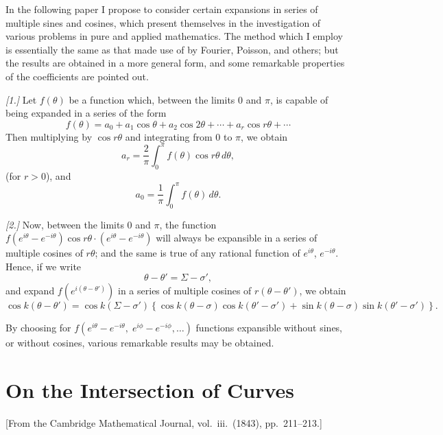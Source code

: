 \documentclass[11pt,a4paper]{book}
\begin{document}
In the following paper I propose to consider certain expansions in series of multiple sines and cosines, which present themselves in the investigation of various problems in pure and applied mathematics. The method which I employ is essentially the same as that made use of by Fourier, Poisson, and others; but the results are obtained in a more general form, and some remarkable properties of the coefficients are pointed out.

\textit{[1.]} Let $f(\theta)$ be a function which, between the limits $0$ and $\pi$, is capable of being expanded in a series of the form
\[
f(\theta) = a_0 + a_1 \cos \theta + a_2 \cos 2\theta + \cdots + a_r \cos r\theta + \cdots
\]
Then multiplying by $\cos r\theta$ and integrating from $0$ to $\pi$, we obtain
\[
a_r = \frac{2}{\pi} \int_0^{\pi} f(\theta) \cos r\theta\, d\theta,
\]
(for $r > 0$), and
\[
a_0 = \frac{1}{\pi} \int_0^{\pi} f(\theta)\, d\theta.
\]

\textit{[2.]} Now, between the limits $0$ and $\pi$, the function $f(e^{i\theta} - e^{-i\theta}) \cos r\theta \cdot (e^{i\theta} - e^{-i\theta})$ will always be expansible in a series of multiple cosines of $r\theta$; and the same is true of any rational function of $e^{i\theta}$, $e^{-i\theta}$. Hence, if we write
\[
\theta - \theta' = \Sigma - \sigma',
\]
and expand $f(e^{i(\theta-\theta')})$ in a series of multiple cosines of $r(\theta - \theta')$, we obtain
\[
\cos k(\theta - \theta') = \cos k(\Sigma - \sigma') \left\{\cos k(\theta - \sigma) \cos k(\theta' - \sigma') + \sin k(\theta - \sigma) \sin k(\theta' - \sigma')\right\}.
\]

By choosing for $f(e^{i\theta} - e^{-i\theta},\; e^{i\phi} - e^{-i\phi},\ldots)$ functions expansible without sines, or without cosines, various remarkable results may be obtained.

\cleardoublepage

\chapter{On the Intersection of Curves}
\label{chap:paper5}

\begin{center}
\small[From the Cambridge Mathematical Journal, vol.~iii.\ (1843), pp.~211--213.]
\end{center}

\section*{}
\end{document}
